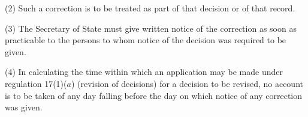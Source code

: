 \documentclass[a4paper,12pt]{article}
\begin{document}
(2) Such a correction is to be treated as part of that decision or of that record.

(3) The Secretary of State must give written notice of the correction as soon as practicable to the persons to whom notice of the decision was required to be given.

(4) In calculating the time within which an application may be made under regulation 17(1)($a$)  (revision of decisions) for a decision to be revised, no account is to be taken of any day falling before the day on which notice of any correction was given.

\end{document}
